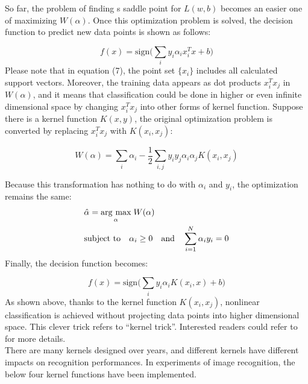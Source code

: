   \noindent So far, the problem of finding s saddle point for $L(w, b)$ becomes an easier one of maximizing $W(\alpha)$. Once this optimization problem is solved, the decision function to predict new data points is shown as follows:

  \begin{equation}
  f(x) = \text{sign}\bigg(\sum_i y_i \alpha_i x_i^T x + b\bigg)
  \end{equation}
  Please note that in equation (7), the point set $\{x_i\}$ includes all calculated support vectors. Moreover, the training data appears as dot products $x_i^T x_j$ in $W(\alpha)$, and it means that classification could be done in higher or even infinite dimensional space by changing $x_i^T x_j$ into other forms of kernel function. Suppose there is a kernel function $K(x, y)$, the original optimization problem is converted by replacing $x_i^T x_j$ with $K(x_i, x_j)$:

  \begin{equation}
  W(\alpha) = \sum_i \alpha_i - \frac{1}{2} \sum_{i,j} y_i y_j \alpha_i \alpha_j K(x_i, x_j)
  \end{equation}

  \noindent Because this transformation has nothing to do with $\alpha_i$ and $y_i$, the optimization remains the same:
  \begin{eqnarray}
  & \hat{\alpha} = \underset{\alpha}{\operatorname{arg}\,\operatorname{max}}\; W(\alpha) \nonumber\\
  & \text{subject to} \quad \alpha_i \ge 0  \quad \text{and} \quad \sum_{i=1}^{N} \alpha_i y_i = 0
  \end{eqnarray}
  Finally, the decision function becomes:

  \begin{equation}
  f(x) = \text{sign}\bigg(\sum_i y_i \alpha_i K(x_i,x) + b\bigg)
  \end{equation}
  As shown above, thanks to the kernel function $K(x_i, x_j)$, nonlinear classification is achieved without projecting data points into higher dimensional space. This clever trick refers to ``kernel trick''. Interested readers could refer to \cite{burges1998tutorial} for more details. \\

  \noindent There are many kernels designed over years, and different kernels have different impacts on recognition performances. In experiments of image recognition, the below four kernel functions have been implemented.
  
